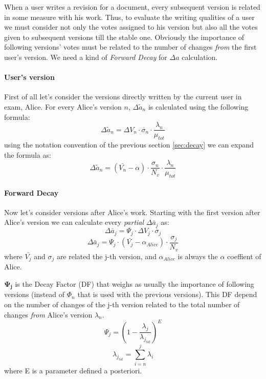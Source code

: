 \documentclass[a4paper,11pt]{article}
\newcommand{\al}{$\alpha$ }
\begin{document}
When a user writes a revision for a document, every subsequent version is related in some measure with his work. Thus, to evaluate the writing qualities of a user we must consider not only the votes assigned to his version but also all the votes given to subsequent versions till the stable one. Obviously the importance of following versions' votes must be related to the number of changes \emph{from} the first user's version. 
We need a kind of \emph{Forward Decay} for $\Delta a$ calculation.

\paragraph{User's version} First of all let's consider the versions directly written by the current user in exam, Alice. For every Alice's version $n$, $\Delta \tilde{a}_n$ is calculated using the following formula:
\begin{equation} 
\Delta \tilde{a}_n = \Delta V_n  \cdot \mathring{\sigma_n} \cdot \frac{\lambda_n}{\mu_{tot}}
\end{equation}
using the notation convention of the previous section \ref{sec:decay} we can expand the formula as:
\begin{equation}\label{eq:delta_a_par}
\Delta \tilde{a}_n = \left(\bar{V_n} - \alpha\right) \cdot \frac{\sigma_n}{N_v} \cdot \frac{\lambda_n}{\mu_{tot}}
\end{equation}

\paragraph{Forward Decay} Now let's consider versions after Alice's work. Starting with the first version after Alice's version we can calculate every \emph{partial} $\Delta \bar{a}_j$ as:
\begin{equation}
\Delta \bar{a}_j = \Psi_j \cdot \Delta V_j \cdot \mathring{\sigma_j}
\end{equation}
\begin{equation} \label{eq:delta_a_DF}
\Delta \bar{a}_j = \Psi_j \cdot \left(\bar{V_j}- \alpha_{Alice}\right) \cdot \frac{\sigma_j}{N_v}
\end{equation}
where $\bar{V_j}$ and $\sigma_j$ are related the j-th version, and $\alpha_{Alice}$ is always the \al coeffient of Alice.

$\mathbf{\Psi_j}$ is the Decay Factor (DF) that weighs as usually the importance of following versions (instead of $\Phi_n$ that is used with the previous versions).
This DF depend on the number of changes of the j-th version related to the total number of changes \emph{from} Alice's version $\lambda_n$.
\begin{equation} \label{eq:psi}
\Psi_j = \left(1- \frac{\lambda_j}{\lambda_{j_{tot}}}\right)^E
\end{equation}
\begin{equation}
\lambda_{j_{tot}} = \sum_{i=n}^j \lambda_i
\end{equation}
where E is a parameter defined a posteriori.
\end{document}
